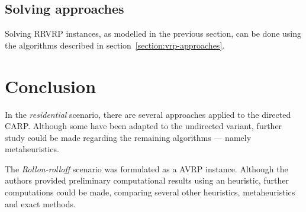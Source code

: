 \subsection{Solving approaches}
\label{section:rrvrp-approaches}

Solving RRVRP instances, as modelled in the previous section, can be done using
the algorithms described in section~\ref{section:vrp-approaches}.



\section{Conclusion}

In the \textit{residential} scenario, there are several approaches applied to
the directed CARP. Although some have been adapted to the undirected variant,
further study could be made regarding the remaining algorithms --- namely
metaheuristics.

The \textit{Rollon-rolloff} scenario was formulated as a AVRP instance. Although
the authors provided preliminary computational results using an heuristic, further
computations could be made, comparing several other heuristics, metaheuristics and
exact methods.


